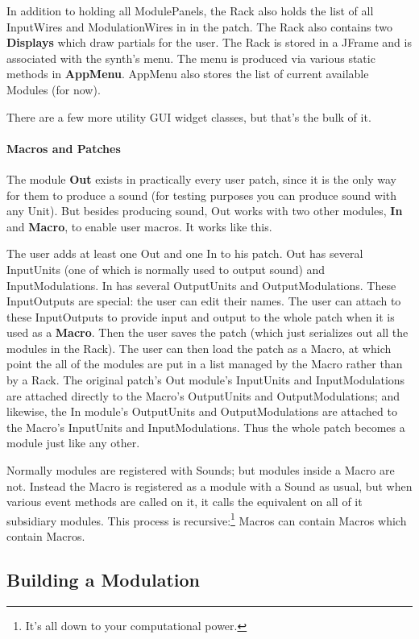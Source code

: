 \documentclass{article}
\begin{document}
In addition to holding all ModulePanels, the Rack also holds the list of all InputWires and ModulationWires in in the patch.  The Rack also contains two {\bf Displays} which draw partials for the user.   The Rack is stored in a JFrame and is associated with the synth's menu.  The menu is produced via various static methods in {\bf AppMenu}.  AppMenu also stores the list of current available Modules (for now).

There are a few more utility GUI widget classes, but that's the bulk of it.

\paragraph{Macros and Patches}

The module {\bf Out} exists in practically every user patch, since it is the only way for them to produce a sound (for testing purposes you can produce sound with any Unit).  But besides producing sound, Out works with two other modules, {\bf In} and {\bf Macro}, to enable user macros.  It works like this. 

The user adds at least one Out and one In to his patch.  Out has several InputUnits (one of which is normally used to output sound) and InputModulations.  In has several OutputUnits and OutputModulations.  These InputOutputs are special: the user can edit their names.  The user can attach to these InputOutputs to provide input and output to the whole patch when it is used as a {\bf Macro}.    Then the user saves the patch (which just serializes out all the modules in the Rack).  The user can then load the patch as a Macro, at which point the all of the modules are put in a list managed by the Macro rather than by a Rack.  The original patch's Out module's InputUnits and InputModulations are attached directly to the Macro's OutputUnits and OutputModulations; and likewise, the In module's OutputUnits and OutputModulations are attached to the Macro's InputUnits and InputModulations.  Thus the whole patch becomes a module just like any other. 

Normally modules are registered with Sounds; but modules inside a Macro are not.  Instead the Macro is registered as a module with a Sound as usual, but when various event methods are called on it, it calls the equivalent on all of it subsidiary modules.  This process is recursive:\footnote{It's all down to your computational power.} Macros can contain Macros which contain Macros.


\subsection{Building a Modulation}
\label{buildlingamodulation}
\end{document}
